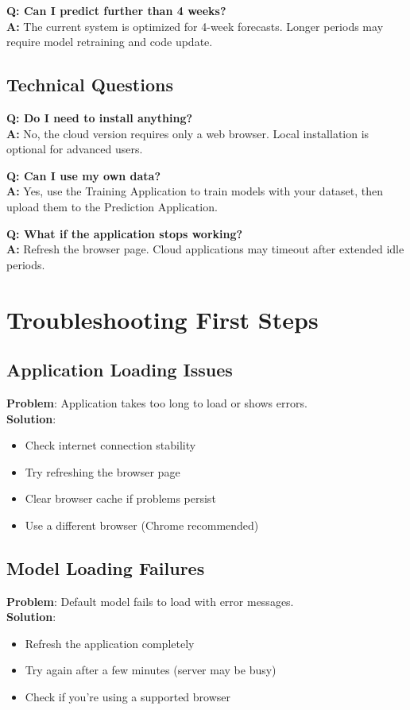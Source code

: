 \textbf{Q: Can I predict further than 4 weeks?}\\
\textbf{A:} The current system is optimized for 4-week forecasts. Longer periods may require model retraining and code update.

\subsection{Technical Questions}

\textbf{Q: Do I need to install anything?}\\
\textbf{A:} No, the cloud version requires only a web browser. Local installation is optional for advanced users.

\textbf{Q: Can I use my own data?}\\
\textbf{A:} Yes, use the Training Application to train models with your dataset, then upload them to the Prediction Application.

\textbf{Q: What if the application stops working?}\\
\textbf{A:} Refresh the browser page. Cloud applications may timeout after extended idle periods.

\section{Troubleshooting First Steps}

\subsection{Application Loading Issues}

\textbf{Problem}: Application takes too long to load or shows errors.\\
\textbf{Solution}:
\begin{itemize}
	\item Check internet connection stability
	\item Try refreshing the browser page
	\item Clear browser cache if problems persist
	\item Use a different browser (Chrome recommended)
\end{itemize}

\subsection{Model Loading Failures}

\textbf{Problem}: Default model fails to load with error messages.\\
\textbf{Solution}:
\begin{itemize}
	\item Refresh the application completely
	\item Try again after a few minutes (server may be busy)
	\item Check if you're using a supported browser
\end{itemize}

